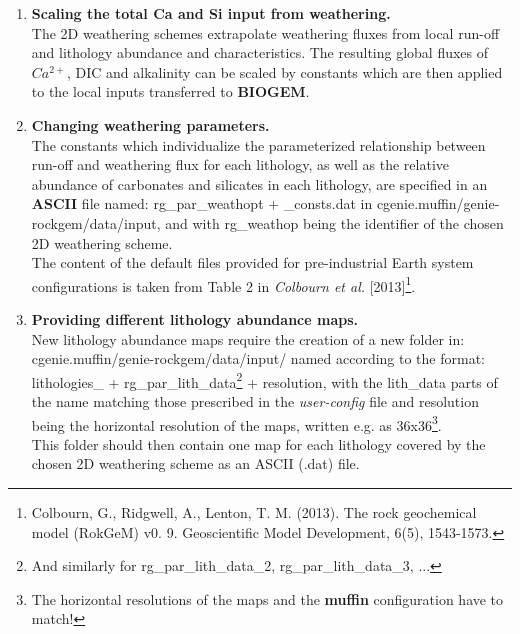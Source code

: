 \begin{enumerate}[noitemsep]
\vspace{1mm}
\item \textbf{Scaling the total Ca and Si input from weathering.}
\\The 2D weathering schemes extrapolate weathering fluxes from local run-off and lithology abundance and characteristics. The resulting global fluxes of \(Ca^{2+}\), DIC and alkalinity can be scaled by constants which are then applied to the local inputs transferred to \textbf{BIOGEM}.
\vspace{1mm}
\item \textbf{Changing weathering parameters.}
\\The constants which individualize the parameterized relationship between run-off and weathering flux for each lithology, as well as the relative abundance of carbonates and silicates in each lithology, are specified in an \textbf{ASCII} file named: \textsf{\footnotesize rg\_par\_weathopt} + \textsf{\footnotesize \_consts.dat} in \textsf{\footnotesize cgenie.muffin/genie-rockgem/data/input}, and with \textsf{\footnotesize rg\_weathop} being the identifier of the chosen 2D weathering scheme.
\\The content of the default files provided for pre-industrial Earth system configurations is taken from Table 2 in \textit{Colbourn et al.} [2013]\footnote{Colbourn, G., Ridgwell, A., Lenton, T. M. (2013). The rock geochemical model (RokGeM) v0. 9. Geoscientific Model Development, 6(5), 1543-1573.}.
\vspace{1mm}
\item \textbf{Providing different lithology abundance maps.}
\\New lithology abundance maps require the creation of a new folder in: \textsf{\footnotesize cgenie.muffin/genie-rockgem/data/input/} named according to the format: \textsf{\footnotesize lithologies\_} + \textsf{\footnotesize rg\_par\_lith\_data}\footnote{And similarly for \textsf{\footnotesize rg\_par\_lith\_data\_2}, \textsf{\footnotesize rg\_par\_lith\_data\_3}, ...} + \textsf{\footnotesize resolution}, with the \textsf{\footnotesize lith\_data} parts of the name matching those prescribed in the \textit{user-config} file and \textsf{\footnotesize resolution} being the horizontal resolution of the maps, written e.g. as \textsf{\footnotesize 36x36}\footnote{The horizontal resolutions of the maps and the \textbf{muffin} configuration have to match!}.
\\This folder should then contain one map for each lithology covered by the chosen 2D weathering scheme as an ASCII (\textsf{\footnotesize .dat}) file.
\end{enumerate}

